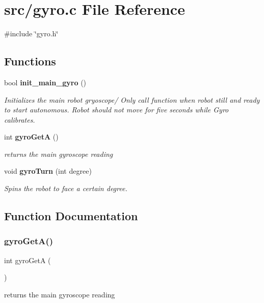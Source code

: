 \section{src/gyro.c File Reference}
\label{gyro_8c}
{\ttfamily \#include \char`\"{}gyro.\+h\char`\"{}}\newline
\subsection*{Functions}
\begin{DoxyCompactItemize}
\item 
bool \textbf{ init\+\_\+main\+\_\+gyro} ()
\begin{DoxyCompactList}\small\item\em Initializes the main robot gryoscope/ Only call function when robot still and ready to start autonomous. Robot should not move for five seconds while Gyro calibrates. \end{DoxyCompactList}\item 
int \textbf{ gyro\+GetA} ()
\begin{DoxyCompactList}\small\item\em returns the main gyroscope reading \end{DoxyCompactList}\item 
void \textbf{ gyro\+Turn} (int degree)
\begin{DoxyCompactList}\small\item\em Spins the robot to face a certain degree. \end{DoxyCompactList}\end{DoxyCompactItemize}


\subsection{Function Documentation}
\mbox{\label{gyro_8c_a5a5a31229f1d815f1b9ebd4ddd1a58ff}} 
\subsubsection{gyro\+Get\+A()}
{\footnotesize\ttfamily int gyro\+GetA (\begin{DoxyParamCaption}{ }\end{DoxyParamCaption})}



returns the main gyroscope reading 


